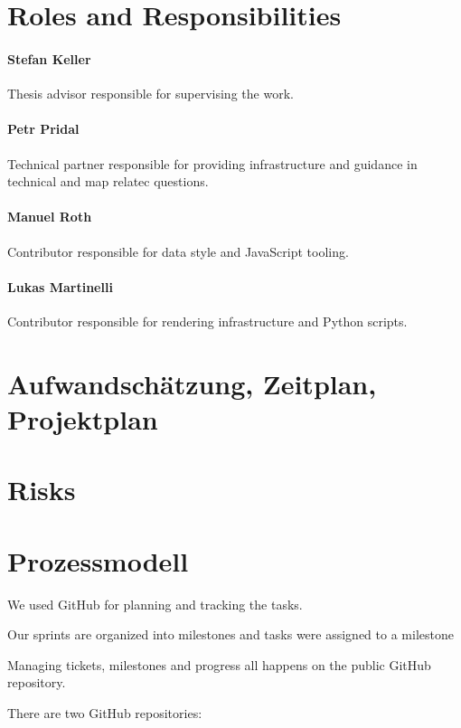 \section{Roles and Responsibilities}\label{roles-and-responsibilities}

\paragraph{Stefan Keller}
Thesis advisor responsible for supervising the work.

\paragraph{Petr Pridal}
Technical partner responsible for providing infrastructure and guidance
in technical and map relatec questions.

\paragraph{Manuel Roth}
Contributor responsible for data style and JavaScript tooling.

\paragraph{Lukas Martinelli}
Contributor responsible for rendering infrastructure and Python scripts.

\section{Aufwandschätzung, Zeitplan, Projektplan}

\section{Risks}\label{risks}

\section{Prozessmodell}

We used GitHub for planning and tracking the tasks.

Our sprints are organized into milestones and tasks were assigned to a milestone

Managing tickets, milestones and progress all happens on the public
GitHub repository.



There are two GitHub repositories:

